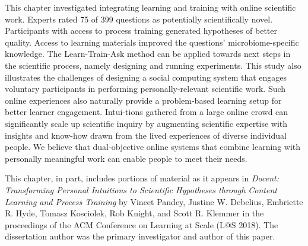 This chapter investigated integrating learning and training with online scientific work. Experts rated 75 of 399 questions as potentially scientifically novel. Participants with access to process training generated hypotheses of better quality. Access to learning materials improved the questions’ microbiome-specific knowledge.  The Learn-Train-Ask method can be applied towards next steps in the scientific process, namely designing and running experiments. This study also illustrates the challenges of designing a social computing system that engages voluntary participants in performing personally-relevant scientific work. Such online experiences also naturally provide a problem-based learning setup for better learner engagement. Intui-tions gathered from a large online crowd can significantly scale up scientific inquiry by augmenting scientific expertise with insights and know-how drawn from the lived experiences of diverse individual people. We believe that dual-objective online systems that combine learning with personally meaningful work can enable people to meet their needs.

This chapter, in part, includes portions of material as it appears in \emph{Docent: Transforming Personal Intuitions to Scientific Hypotheses through Content Learning and Process Training} by Vineet Pandey, Justine W. Debelius, Embriette R. Hyde, Tomasz Kosciolek, Rob Knight, and Scott R. Klemmer in the proceedings of the ACM Conference on Learning at Scale (L@S 2018). The dissertation author was the primary investigator and author of this paper.

